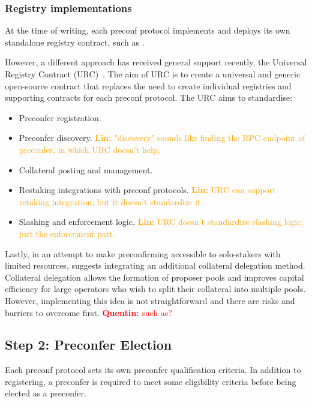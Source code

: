 \documentclass[a4paper]{article}
\theoremstyle{boldstyle}
\newcommand{\qb}[1]{\textcolor{red}{\textbf{Quentin:} #1}}
\newcommand{\lo}[1]{\textcolor{orange}{\textbf{Lin:} #1}}
\begin{document}
        \subsubsection{Registry implementations} \label{registry_implementations}
        
        At the time of writing, each preconf protocol implements and deploys its own standalone registry contract, such as \cite{W:Documentation-RegisteringasaProvider}.

        However, a different approach has received general support recently, the Universal Registry Contract (URC)~\cite{W:UniversalRegistryContract}. The aim of URC is to create a universal and generic open-source contract that replaces the need to create individual registries and supporting contracts for each preconf protocol. The URC aims to standardise:
         \begin{itemize} 
             \item Preconfer registration.
             \item Preconfer discovery. \lo{"discovery" sounds like finding the RPC endpoint of preconfer, in which URC doesn't help.}
             \item Collateral posting and management.
             \item Restaking integrations with preconf protocols. \lo{URC can support retaking integration, but it doesn't standardize it.}
             \item Slashing and enforcement logic. \lo{URC doesn't standardize slashing logic, just the enforcement part.}
         \end{itemize}

        Lastly, in an attempt to make preconfirming accessible to solo-stakers with limited resources, \cite{W:CrediblyNeutralPreconfirmationCollateral:ThePreconfirmationRegistry} suggests integrating an additional collateral delegation method. Collateral delegation allows the formation of proposer pools and improves capital efficiency for large operators who wish to split their collateral into multiple pools. However, implementing this idea is not straightforward and there are risks and barriers to overcome first. \qb{such as?}

\subsection{Step 2: Preconfer Election}
        Each preconf protocol sets its own preconfer qualification criteria. 
    In addition to registering, a preconfer is required to meet some eligibility criteria before being elected as a preconfer.
\end{document}
